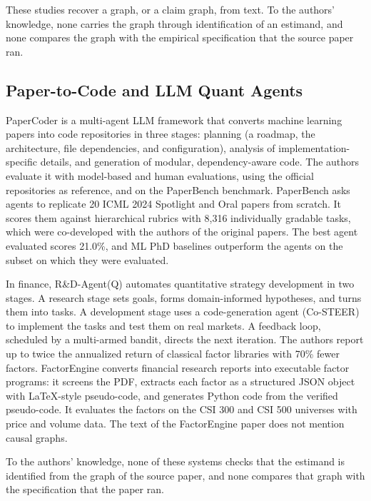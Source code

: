   These studies recover a graph, or a claim graph, from text. To the authors'
  knowledge, none carries the graph through identification of an estimand,
  and none compares the graph with the empirical specification that the
  source paper ran.

  \subsection{Paper-to-Code and LLM Quant Agents}\label{sec:sota_code}

  PaperCoder \cite{seo2026paper2code} is a multi-agent LLM framework that
  converts machine learning papers into code repositories in three stages:
  planning (a roadmap, the architecture, file dependencies, and
  configuration), analysis of implementation-specific details, and generation
  of modular, dependency-aware code. The authors evaluate it with model-based
  and human evaluations, using the official repositories as reference, and on
  the PaperBench benchmark. PaperBench \cite{starace2025paperbench} asks
  agents to replicate 20 ICML 2024 Spotlight and Oral papers from scratch.
  It scores them against hierarchical rubrics with 8,316 individually
  gradable tasks, which were co-developed with the authors of the original
  papers. The best agent evaluated scores 21.0\%, and ML PhD baselines
  outperform the agents on the subset on which they were evaluated.

  In finance, R\&D-Agent(Q) \cite{li2025rdagent} automates quantitative
  strategy development in two stages. A research stage sets goals, forms
  domain-informed hypotheses, and turns them into tasks. A development stage
  uses a code-generation agent (Co-STEER) to implement the tasks and test
  them on real markets. A feedback loop, scheduled by a multi-armed bandit,
  directs the next iteration. The authors report up to twice the annualized
  return of classical factor libraries with 70\% fewer factors.
  FactorEngine \cite{lin2026factorengine} converts financial research
  reports into executable factor programs: it screens the PDF, extracts each
  factor as a structured JSON object with LaTeX-style pseudo-code, and
  generates Python code from the verified pseudo-code. It evaluates the
  factors on the CSI 300 and CSI 500 universes with price and volume data.
  The text of the FactorEngine paper does not mention causal graphs.

  To the authors' knowledge, none of these systems checks that the estimand
  is identified from the graph of the source paper, and none compares that
  graph with the specification that the paper ran.

